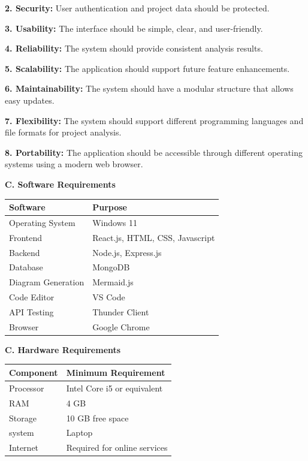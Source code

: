 \documentclass[0pt, a4 paper]{report}
\begin{document}
\begin{center}
{\justify \textbf{2. Security:} User authentication and project data should be protected.

\justify \textbf{3. Usability:} The interface should be simple, clear, and user-friendly.

\justify \textbf{4. Reliability:} The system should provide consistent analysis results.

\justify \textbf{5. Scalability:} The application should support future feature enhancements.

\justify \textbf{6. Maintainability:} The system should have a modular structure that allows easy updates.

\justify \textbf{7. Flexibility:} The system should support different programming languages and file formats for project analysis.

\justify \textbf{8. Portability:} The application should be accessible through different operating systems using a modern web browser.


\vspace{1.5cm}
\justify \textbf{C. Software Requirements}

\vspace{0.2cm}
    

\begin{tabular}{||m{7 cm}| |m{7 cm}||} 
\hline
\textbf{Software} & \textbf{Purpose} \\
\hline
Operating System & Windows 11 \\
\hline
Frontend & React.js, HTML, CSS, Javascript\\
\hline
Backend  &  Node.js, Express.js \\
\hline
Database & MongoDB \\
\hline
Diagram Generation  & Mermaid.js \\
\hline 
Code Editor & VS Code \\
\hline
API Testing & Thunder Client \\ 
\hline
Browser & Google Chrome \\ 
\hline
\end{tabular}



\justify \textbf{C. Hardware Requirements}

\vspace{0.2cm}
    

\begin{tabular}{||m{7 cm}| |m{7 cm}||} 
\hline
\textbf{Component} & \textbf{Minimum Requirement} \\
\hline
 Processor   & Intel Core i5 or equivalent\\
\hline
RAM  &  4 GB \\
\hline
Storage & 10 GB free space \\
\hline
system  & Laptop \\
\hline 
Internet & Required for online services \\
\hline


\end{tabular}}
\end{center}
\end{document}
